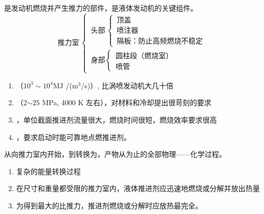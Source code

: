 是发动机燃烧并产生推力的部件，是液体发动机的关键组件。
\begin{equation*}
	\mbox{推力室} \,
	\begin{cases}
		\, \mbox{头部} \,
			\begin{cases}
				\, \mbox{顶盖}\\
				\, \mbox{喷注器}\\
				\, \mbox{隔板：防止高频燃烧不稳定}
			\end{cases}
			\\[2.5em]
		\, \mbox{身部}
			\begin{cases}
				\, \mbox{圆柱段（燃烧室）}\\
				\, \mbox{喷管}
			\end{cases}
	\end{cases}
\end{equation*}

\blue[主要特点]
\vspace*{-0.5em}
\begin{enumerate}[\hspace*{3em} $\bigstar$]
	\item \red[燃烧室工作容积热容强度很大] （$10^3\sim10^4$MJ /($\text{m}^3$/s)）, 比涡喷发动机大几十倍\vspace*{-0.5em}
	\item \red[燃烧室压强和温度均很高] （2$\sim$25 MPa, 4000 K 左右），对材料和冷却提出很苛刻的要求\vspace*{-0.5em}
	\item \red[燃烧组织有很大难度]，单位截面推进剂流量很大，燃烧时间很短，燃烧效率要求很高\vspace*{-0.5em}
	\item \red[推进剂组元的每秒消耗量相当大] ，要求启动时能可靠地点燃推进剂。
\end{enumerate}
\vspace*{0.8em}

\sssection[推力室工作过程]


从向推力室内\red[喷入推进剂组元]开始，到\red[推进剂燃烧]转换为\red[燃烧产物] ，产物从\red[喷管喷出产生推力]为止的全部物理——化学过程。
\vspace*{0.5em}

\vspace*{-0.5em}
\begin{enumerate}[\hspace*{3em} $\bigstar$]
	\item 复杂的能量转换过程\vspace*{-0.5em}
	\item 在尺寸和重量都受限的推力室内，液体推进剂应迅速地燃烧或分解并放出热量\vspace*{-0.5em}
	\item 为得到最大的比推力，推进剂燃烧或分解时应放热最完全。
\end{enumerate}

